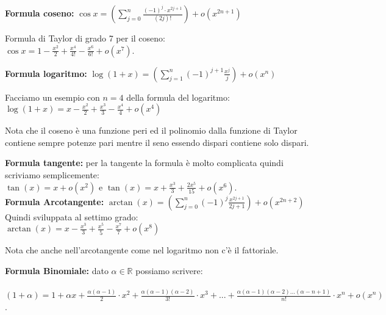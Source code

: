 \hspace{-15pt}\textbf{Formula coseno:} $\cos{x} = (\sum\limits_{j = 0}^n \frac{(-1)^j \cdot x^{2j +1}}{(2j)!}) + o(x^{2n+1})$
\begin{example}
Formula di Taylor di grado 7 per il coseno:\\
$\cos{x} = 1 - \frac{x^2}{2} + \frac{x^4}{4!} - \frac{x^6}{6!} + o(x^7)$.\\
\end{example}

\hspace{-15pt}\textbf{Formula logaritmo:} $\log(1+x) = (\sum\limits_{j=1}^n(-1)^{j+1}\frac{x^j}{j}) + o(x^n)$
\begin{example}
Facciamo un esempio con $n=4$ della formula del logaritmo:\\
$\log(1+x) = x - \frac{x^2}{2} + \frac{x^3}{3} - \frac{x^4}{4} + o(x^4)$
\end{example}

\begin{note}
Nota che il coseno è una funzione peri ed il polinomio dalla funzione di Taylor contiene sempre potenze pari mentre il seno essendo dispari contiene solo dispari.\\
\end{note}

\hspace{-15pt}\textbf{Formula tangente:} per la tangente la formula è molto complicata quindi scriviamo semplicemente:\\
$\tan(x) = x + o(x^2)$ e $\tan(x) = x + \frac{x^3}{3} + \frac{2x^5}{15} + o(x^6)$.\\

\hspace{-15pt}\textbf{Formula Arcotangente:} $\arctan(x) = (\sum\limits_{j = 0}^n (-1)^j \frac{x^{2j +1}}{2j +1}) + o(x^{2n+2})$
Quindi sviluppata al settimo grado:\\
$\arctan(x) = x - \frac{x^3}{3} + \frac{x^5}{5} - \frac{x^7}{7} + o(x^8)$
\begin{note}
Nota che anche nell'arcotangente come nel logaritmo non c'è il fattoriale.\\
\end{note}

\hspace{-15pt}\textbf{Formula Binomiale:} dato $\alpha \in \mathbb{R}$ possiamo scrivere:\\\\
$(1+ \alpha) = 1 + \alpha x + \frac{\alpha(\alpha -1)}{2} \cdot x^2 + \frac{\alpha(\alpha -1)(\alpha -2)}{3!}\cdot x^3 + ... + \frac{\alpha(\alpha -1)(\alpha -2)...(\alpha - n+1)}{n!}\cdot x^n + o(x^n)$.


